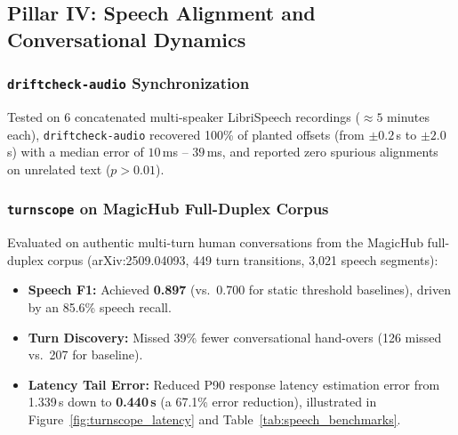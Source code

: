 \documentclass[10pt,journal,compsoc]{IEEEtran}
\begin{document}
\subsection{Pillar IV: Speech Alignment and Conversational Dynamics}

\subsubsection{\texttt{driftcheck-audio} Synchronization}
Tested on 6 concatenated multi-speaker LibriSpeech recordings ($\approx 5$ minutes each), \texttt{driftcheck-audio} recovered 100\% of planted offsets (from $\pm 0.2$\,s to $\pm 2.0$\,s) with a median error of $10$\,ms -- $39$\,ms, and reported zero spurious alignments on unrelated text ($p > 0.01$).

\subsubsection{\texttt{turnscope} on MagicHub Full-Duplex Corpus}
Evaluated on authentic multi-turn human conversations from the MagicHub full-duplex corpus \cite{magichub2024} (arXiv:2509.04093, 449 turn transitions, 3,021 speech segments):
\begin{itemize}
    \item \textbf{Speech F1:} Achieved \textbf{0.897} (vs.\ 0.700 for static threshold baselines), driven by an 85.6\% speech recall.
    \item \textbf{Turn Discovery:} Missed 39\% fewer conversational hand-overs (126 missed vs.\ 207 for baseline).
    \item \textbf{Latency Tail Error:} Reduced P90 response latency estimation error from 1.339\,s down to \textbf{0.440\,s} (a 67.1\% error reduction), illustrated in Figure~\ref{fig:turnscope_latency} and Table~\ref{tab:speech_benchmarks}.
\end{itemize}

\begin{table}[h]
\centering
\caption{Conversational Dynamics Evaluation on MagicHub (Pillar IV).}
\label{tab:speech_benchmarks}
\end{table}
\end{document}
